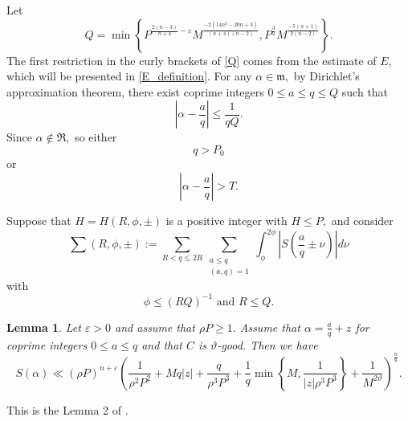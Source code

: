 \documentclass[12pt]{amsart}
\newtheorem{lemma}[theorem]{Lemma}
\theoremstyle{definition}
\numberwithin{equation}{section}
\begin{document}
Let 
\begin{equation}%
    \label{Q}
    Q=\min\left\{P^{\frac{2(n-3)}{n+4}-\varepsilon}M^{\frac{-2(14n^2-20n+3)}{(n+4)(n-2)}}, P^{\frac{3}{2}}M^{\frac{-5(n+1)}{2(n-2)}}\right\}.
\end{equation}
The first restriction in the curly brackets of \eqref{Q} comes from the estimate of $E$, which will be presented in \eqref{E_definition}.
For any $\alpha \in \mathfrak{m},$ by Dirichlet's approximation theorem, there exist coprime integers $0 \leq a \leq q \leq Q$ such that 
\begin{equation}
    \label{Dirichlet_bijin}
    \left| \alpha-\frac{a}{q} \right| \leq \frac{1}{qQ}.
\end{equation}
Since $\alpha \notin \mathfrak{R},$ so either
\begin{equation}
    \label{fenmuda}
    q > P_{0}
\end{equation}
or
\begin{equation}
    \label{banjingda}
    \left| \alpha-\frac{a}{q} \right| > T.
\end{equation}

Suppose that $H=H(R,\phi,\pm)$ is a positive integer with $H \leq P,$ and consider 
\begin{equation*}
    \sum(R,\phi,\pm) := \sum_{R < q \leq 2R}\sum_{\substack{a \leq q\\[3pt](a,q)=1}}\int_{\phi}^{2\phi} \left| S(\frac{a}{q} \pm \nu) \right| d\nu
\end{equation*}
with
\begin{equation}
    \label{Dirichlet_tiaojian}
    \phi \leq (RQ)^{-1}\text{ and }R \leq Q.
\end{equation}



\begin{lemma}
Let $\varepsilon > 0$ and assume that $\rho P \geq 1.$ Assume that $\alpha = \frac{a}{q}+z$ for coprime  integers $0 \leq a 
\leq q$ and that $C$ is $\vartheta$-good. Then we have
\begin{equation*}
    S(\alpha) \ll (\rho P)^{n+\varepsilon}\left(\frac{1}{\rho^2 P^2}+Mq|z|+\frac{q}{\rho^3 P^3}+\frac{1}{q}\min\left\{M,\frac{1}{|z|\rho^3 P^3}\right\}+\frac{1}{M^{2\vartheta}}\right)^{\frac{n}{8}}.
\end{equation*}
\end{lemma}

This is the Lemma 2 of \cite{browning2009least}.
\end{document}

